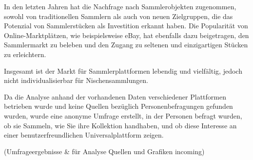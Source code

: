 In den letzten Jahren hat die Nachfrage nach Sammlerobjekten zugenommen, sowohl von traditionellen Sammlern als auch von neuen Zielgruppen, die das Potenzial von Sammlerstücken als Investition erkannt haben.
Die Popularität von Online-Marktplätzen, wie beispielsweise eBay, hat ebenfalls dazu beigetragen, den Sammlermarkt zu beleben und den Zugang zu seltenen und einzigartigen Stücken zu erleichtern. \par
Insgesamt ist der Markt für Sammlerplattformen lebendig und vielfältig, jedoch nicht individualisierbar für Nischensammlungen. \par
Da die Analyse anhand der vorhandenen Daten verschiedener Plattformen betrieben wurde und keine Quellen bezüglich Personenbefragungen gefunden wurden, wurde eine anonyme Umfrage erstellt, in der Personen befragt wurden, ob sie Sammeln, wie Sie ihre Kollektion handhaben, und ob diese Interesse an einer benutzerfreundlichen Universalplattform zeigen. \linebreak

(Umfrageergebnisse \& für Analyse Quellen und Grafiken incoming)

